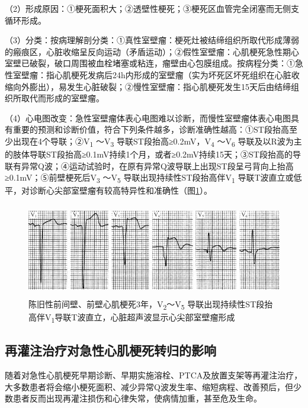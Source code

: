 （2）形成原因：①梗死面积大；②透壁性梗死；③梗死区血管完全闭塞而无侧支循环形成。

（3）分类：按病理解剖分类：①真性室壁瘤：梗死灶被结缔组织所取代形成薄弱的瘢痕区，心脏收缩呈反向运动（矛盾运动）；②假性室壁瘤：心肌梗死急性期心室壁已破裂，破口周围被血栓堵塞或粘连，瘤壁由心包膜组成。按病程分类：①急性室壁瘤：指心肌梗死发病后24h内形成的室壁瘤（实为坏死区坏死组织在心脏收缩向外膨出），易发生心脏破裂；②慢性室壁瘤：指心肌梗死发生15天后由结缔组织所取代而形成的室壁瘤。

（4）心电图改变：急性室壁瘤体表心电图难以诊断，而慢性室壁瘤体表心电图具有重要的预测和诊断价值，符合下列条件越多，诊断准确性越高：①ST段抬高至少出现在4个导联；②V\textsubscript{1}
～V\textsubscript{3} 导联ST段抬高≥0.2mV，V\textsubscript{4}
～V\textsubscript{6}
导联及以R波为主的肢体导联ST段抬高≥0.1mV持续1个月，或者≥0.2mV持续15天；③ST段抬高的导联有异常Q波；④运动试验时，在原有异常Q波导联上出现ST段呈弓背向上抬高≥0.1mV；⑤前壁梗死后V\textsubscript{3}
～V\textsubscript{5} 导联出现持续性ST段抬高伴V\textsubscript{1}
导联T波直立或低平，对诊断心尖部室壁瘤有较高特异性和准确性（图\ref{fig44-16}）。

\begin{figure}[!htbp]
 \centering
 \includegraphics[width=5.08333in,height=1.59375in]{./images/Image00724.jpg}
 \captionsetup{justification=centering}
 \caption{陈旧性前间壁、前壁心肌梗死3年，V\textsubscript{2}～V\textsubscript{5} 导联出现持续性ST段抬高伴V\textsubscript{1}导联T波直立，心脏超声波显示心尖部室壁瘤形成}
 \label{fig44-16}
  \end{figure} 


\protect\hypertarget{text00052.htmlux5cux23subid631}{}{}

\subsection{再灌注治疗对急性心肌梗死转归的影响}

随着对急性心肌梗死早期诊断、早期实施溶栓、PTCA及放置支架等再灌注治疗，大多数患者将会缩小梗死面积、减少异常Q波发生率、缩短病程、改善预后，但少数患者反而出现再灌注损伤和心律失常，使病情加重，甚至危及生命。

